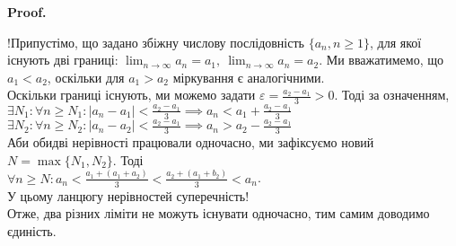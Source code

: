 \documentclass[a4paper, 14pt]{article}
\makeatletter
\def\qed{$\blacksquare$}
\theoremstyle{theoremdd}
\theoremstyle{theoremdd}
\theoremstyle{theoremdd}
\theoremstyle{theoremdd}
\theoremstyle{theoremdd}
\theoremstyle{theoremdd}
\theoremstyle{theoremdd}
\theoremstyle{theoremdd}
\renewenvironment{proof}[1][Proof.\\]{\par
\pushQED{\hfill \qed}%
\normalfont \topsep6\p@\@plus6\p@\relax
\trivlist
\item\relax
{\bfseries
#1\@addpunct{.}}\hspace\labelsep\ignorespaces
}{%
\popQED\endtrivlist\@endpefalse
}
\makeatother
\begin{document}
	\begin{proof}
	!Припустімо, що задано збіжну числову послідовність $\{a_n, n \geq 1\}$, для якої існують дві границі: $\displaystyle \lim_{n \to \infty} a_n = a_1, \ \lim_{n \to \infty} a_n = a_2$. Ми вважатимемо, що $a_1 < a_2$, оскільки для $a_1 > a_2$ міркування є аналогічними.\\
	Оскільки границі існують, ми можемо задати $\displaystyle \varepsilon = \frac{a_2-a_1}{3} > 0$. Тоді за означенням,\\
	$\displaystyle \exists N_1: \forall n \geq N_1: |a_n-a_1|< \frac{a_2-a_1}{3} \implies a_n < a_1 + \frac{a_2-a_1}{3}$\\
	$\displaystyle \exists N_2: \forall n \geq N_2: |a_n-a_2|< \frac{a_2-a_1}{3} \implies a_n > a_2 - \frac{a_2-a_1}{3}$\\
	Аби обидві нерівності працювали одночасно, ми зафіксуємо новий $N= \max\{N_1,N_2\}$. Тоді\\
	$\displaystyle \forall n \geq N: a_n < \frac{a_1+(a_1+a_2)}{3} < \frac{a_2+(a_1+b_2)}{3}<a_n$. \\
	У цьому ланцюгу нерівностей суперечність! \\ 
	Отже, два різних ліміти не можуть існувати одночасно, тим самим доводимо єдиність.
	\end{proof}
	
\end{document}
